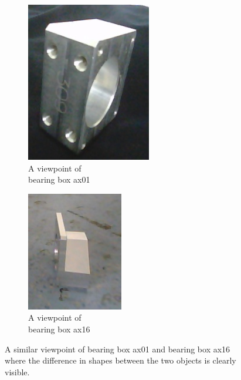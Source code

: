\begin{itemize}
\begin{figure}[!htb]
	\centering
	\begin{subfigure}{.3\textwidth}
  		\centering
  		\includegraphics[width=.5\linewidth]{images/ax01_diff}
  		\caption{A viewpoint of \\bearing box ax01}
  		\label{Fig:sim1a}
	\end{subfigure}%
	\begin{subfigure}{.3\textwidth}
  		\centering
  		\includegraphics[width=.5\linewidth]{images/ax16_diff}
  		\caption{A viewpoint of \\bearing box ax16}
  		\label{Fig:sim1b}
	\end{subfigure}%
	\caption{A similar viewpoint of bearing box ax01 and bearing box ax16 where the difference in shapes between the two objects is clearly visible.}
	\label{Fig:sim1}
\end{figure}


\end{itemize}
